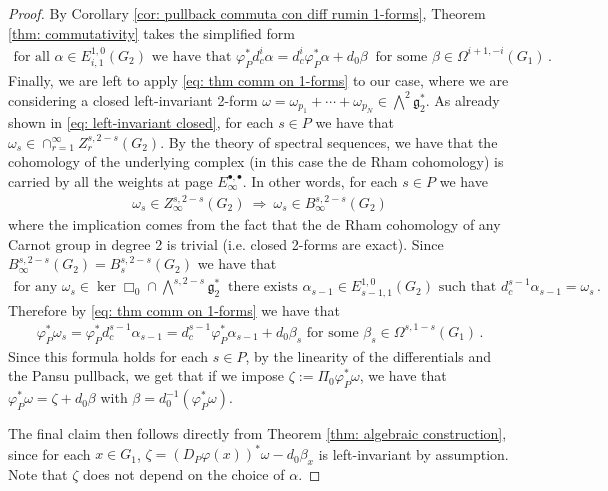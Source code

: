 \documentclass[dvipsnames]{amsart}
\theoremstyle{definition}
\theoremstyle{definition}
\numberwithin{equation}{section}
\begin{document}
\begin{proof}
   
   By Corollary \ref{cor: pullback commuta con diff rumin 1-forms}, Theorem \ref{thm: commutativity} takes the simplified form
   \begin{align}\label{eq: thm comm on 1-forms}
       \text{for all }\alpha\in E_{i,1}^{1,0}(G_2)\text{ we have that }\varphi_P^\ast d_c^i\alpha=d_c^i\varphi_P^\ast\alpha+d_0\beta\ \text{ for some }\beta\in\Omega^{i+1,-i}(G_1)\,.
   \end{align}
   Finally, we are left to apply \eqref{eq: thm comm on 1-forms} to our case, where we are considering a closed left-invariant 2-form $\omega=\omega_{p_1}+\cdots+\omega_{p_N}\in\bigwedge^2\mathfrak{g}_2^\ast$. As already shown in \eqref{eq: left-invariant closed}, for each $s\in P$ we have that $\omega_s\in\cap_{r=1}^\infty Z_r^{s,2-s}(G_2)$. By the theory of spectral sequences, we have that the cohomology of the underlying complex (in this case the de Rham cohomology) is carried by all the weights at page $E_\infty^{\bullet,\bullet}$. In other words, for each $s\in P$ we have
   \begin{align*}
       \omega_s\in Z_\infty^{s,2-s}(G_2)\ \Longrightarrow \ \omega_s\in B^{s,2-s}_\infty(G_2)
   \end{align*}
   where the implication comes from the fact that the de Rham cohomology of any Carnot group in degree 2 is trivial (i.e. closed 2-forms are exact).
   Since $B_\infty^{s,2-s}(G_2)=B_{s}^{s,2-s}(G_2)$ we have that \begin{align*}
       \text{for any }\omega_s\in\ker\Box_0\cap\bigwedge\nolimits^{s,2-s}\mathfrak{g}_2^\ast\ \text{ there exists }\alpha_{s-1}\in E_{s-1,1}^{1,0}(G_2)\text{ such that }d_c^{s-1}\alpha_{s-1}=\omega_s\,.
   \end{align*}
   Therefore by \eqref{eq: thm comm on 1-forms} we have that
   \begin{align*}
       \varphi_P^\ast\omega_s=\varphi_P^\ast d_c^{s-1}\alpha_{s-1}=d_c^{s-1}\varphi_P^\ast\alpha_{s-1}+d_0\beta_s\text{ for some }\beta_s\in\Omega^{s,1-s}(G_1)\,.
   \end{align*}
   Since this formula holds for each $s\in P$, by the linearity of the differentials and the Pansu pullback, we get that if we impose $\zeta:=\Pi_0\varphi_P^\ast\omega$, we have that $\varphi_P^\ast\omega=\zeta+d_0\beta$ with $\beta=d_0^{-1}(\varphi_P^\ast\omega)$.
   
   The final claim then follows directly from Theorem \ref{thm: algebraic construction}, since for each $x\in G_1$, $\zeta=(D_P\varphi(x))^\ast\omega-d_0\beta_x$ is left-invariant by assumption. Note that $\zeta$ does not depend on the choice of $\alpha$.
\end{proof}
\end{document}
